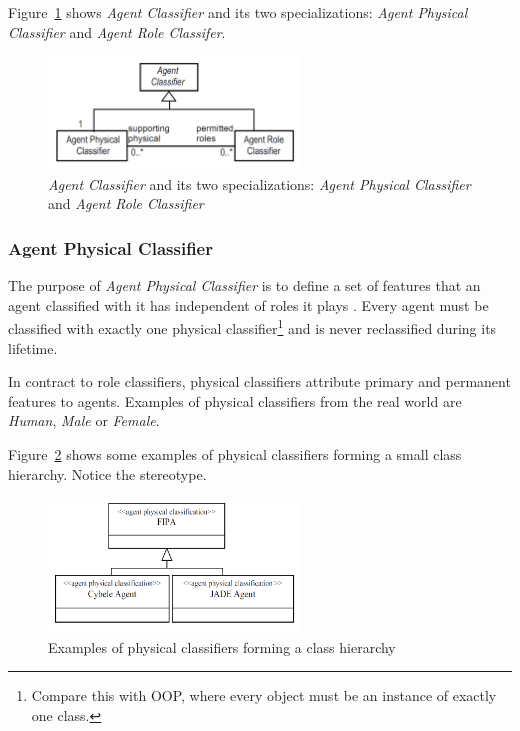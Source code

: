 Figure~\ref{figure:onp-agent-classifiers} shows \textit{Agent Classifier} and its two specializations: \textit{Agent Physical Classifier} and \textit{Agent Role Classifer}.

\begin{figure}[ht]
	\centering
	\includegraphics[width=0.6\textwidth]{images/onp/agent-classifiers.png}
	\caption{\textit{Agent Classifier} and its two specializations: \textit{Agent Physical Classifier} and \textit{Agent Role Classifier} \cite{Odell05}}
	\label{figure:onp-agent-classifiers}
\end{figure}

\subsubsection*{Agent Physical Classifier}

The purpose of \textit{Agent Physical Classifier} is to define a set of features that an agent classified with it has independent of roles it plays \cite{Odell05}.
Every agent must be classified with exactly one physical classifier\footnote{Compare this with OOP, where every object must be an instance of exactly one class.} and is never reclassified during its lifetime.

In contract to role classifiers, physical classifiers attribute primary and permanent features to agents.
Examples of physical classifiers from the real world are \textit{Human}, \textit{Male} or \textit{Female}.

Figure~\ref{figure:onp-physical-classifier-examples} shows some examples of physical classifiers forming a small class hierarchy.
Notice the  stereotype.

\begin{figure}[ht]
	\centering
	\includegraphics[width=0.6\textwidth]{images/onp/physical-classifier-examples.png}
	\caption{Examples of physical classifiers forming a class hierarchy \cite{Odell05}}
	\label{figure:onp-physical-classifier-examples}
\end{figure}

